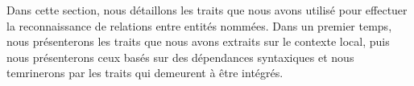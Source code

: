 \documentclass[PhD-Yoann-Dupont.tex]{subfiles}
\begin{document}
Dans cette section, nous détaillons les traits que nous avons utilisé pour effectuer la reconnaissance de relations entre entités nommées. Dans un premier temps, nous présenterons les traits que nous avons extraits sur le contexte local, puis nous présenterons ceux basés sur des dépendances syntaxiques et nous temrinerons par les traits qui demeurent à être intégrés.
\end{document}
